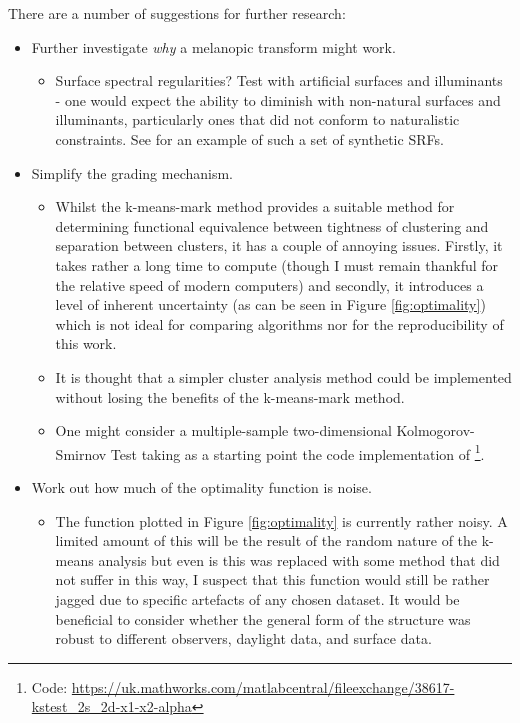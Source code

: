 There are a number of suggestions for further research:
\begin{itemize}
\item Further investigate \emph{why} a melanopic transform might work.
\begin{itemize}
\item Surface spectral regularities? Test with artificial surfaces and illuminants - one would expect the ability to diminish with non-natural surfaces and illuminants, particularly ones that did not conform to naturalistic constraints. See \citet[p. 239-40]{macdonald_realistic_2014} for an example of such a set of synthetic \glspl{SRF}.
\end{itemize}
\item Simplify the grading mechanism.
\begin{itemize}
    \item Whilst the k-means-mark method provides a suitable method for determining functional equivalence between tightness of clustering and separation between clusters, it has a couple of annoying issues. Firstly, it takes rather a long time to compute (though I must remain thankful for the relative speed of modern computers) and secondly, it introduces a level of inherent uncertainty (as can be seen in Figure \ref{fig:optimality}) which is not ideal for comparing algorithms nor for the reproducibility of this work.
    \item It is thought that a simpler cluster analysis method could be implemented without losing the benefits of the k-means-mark method.
    \item One might consider a multiple-sample two-dimensional Kolmogorov-Smirnov Test taking as a starting point the code implementation of \citet{peacock_two-dimensional_1983}\footnote{Code: \url{https://uk.mathworks.com/matlabcentral/fileexchange/38617-kstest_2s_2d-x1-x2-alpha}}.
\end{itemize}
\item Work out how much of the optimality function is noise.
\begin{itemize}
\item The function plotted in Figure \ref{fig:optimality} is currently rather noisy. A limited amount of this will be the result of the random nature of the k-means analysis but even is this was replaced with some method that did not suffer in this way, I suspect that this function would still be rather jagged due to specific artefacts of any chosen dataset. It would be beneficial to consider whether the general form of the structure was robust to different observers, daylight data, and surface data.

\end{itemize}
\end{itemize}
